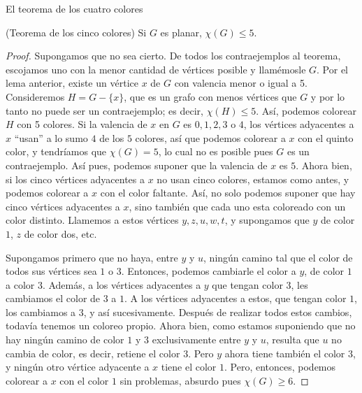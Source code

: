 \begin{section}{El teorema de los cuatro colores}
\begin{teorema}\label{tA4.3.1}(Teorema de los cinco colores) Si $G$ es
planar, $\chi (G)\le 5$.
\end{teorema}
\begin{proof}
 Supongamos que no sea cierto. De todos los
contraejemplos al teorema, escojamos uno con la menor cantidad de
vértices posible y llamémosle $G$. Por el lema anterior, existe un
vértice $x$ de $G$ con valencia menor o igual a 5. Consideremos
$H=G-\{x\}$, que es un grafo con menos vértices que $G$ y por lo tanto
no puede ser un contraejemplo; es decir, $\chi (H)\le 5$. Así,
podemos colorear $H$ con 5 colores. Si la valencia de $x$ en $G$
es $0,1,2,3$ o $4$, los vértices adyacentes a $x$ ``usan'' a lo sumo
$4$ de los $5$ colores, así que podemos colorear a $x$ con el quinto
color, y tendríamos que $\chi (G)=5$, lo cual no es posible pues
$G$ es un contraejemplo. Así pues, podemos suponer que la valencia
de $x$ es $5$. Ahora bien, si los cinco vértices adyacentes a $x$ no
usan cinco colores, estamos como antes, y podemos colorear a $x$
con el color faltante. Así, no solo podemos suponer que hay cinco
vértices adyacentes a $x$, sino también que cada uno esta
coloreado con un color distinto. Llamemos a estos vértices
$y,z,u,w,t$, y supongamos que $y$ de color $1$, $z$ de color dos,
etc.

\begin{figure}[h]
	\begin{center}
\end{center}
\caption{}\label{fA4.11}
\end{figure}

Supongamos primero que no haya, entre $y$ y $u$, ningún camino tal
que el color de todos sus vértices sea $1$ o $3$. Entonces, podemos
cambiarle el color a $y$, de color $1$ a color $3$. Además, a los
vértices adyacentes a $y$ que tengan color $3$, les cambiamos el
color de $3$ a $1$. A los vértices adyacentes a estos, que tengan
color $1$, los cambiamos a $3$, y así sucesivamente. Después de
realizar todos estos cambios, todavía tenemos un coloreo propio.
Ahora bien, como estamos suponiendo que no hay ningún camino de
color $1$ y $3$ exclusivamente entre $y$ y $u$, resulta que $u$ no
cambia de color, es decir, retiene el color $3$. Pero $y$ ahora
tiene también el color $3$, y ningún otro vértice adyacente a $x$
tiene el color $1$. Pero, entonces, podemos colorear a $x$ con el
color $1$ sin problemas, absurdo pues $\chi(G)\ge 6$.


\end{proof}
\end{section}
